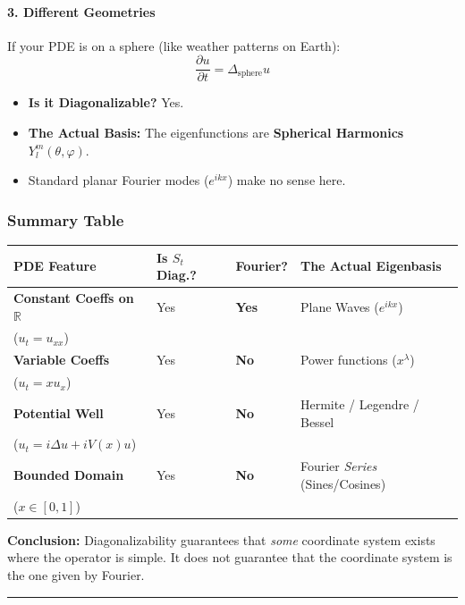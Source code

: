 \documentclass[oneside]{book}
\renewcommand{\phi}{\varphi}
\begin{document}
\paragraph{3. Different Geometries}
If your PDE is on a sphere (like weather patterns on Earth):
\[ \frac{\partial u}{\partial t} = \Delta_{\text{sphere}} u \]
\begin{itemize}
    \item \textbf{Is it Diagonalizable?} Yes.
    \item \textbf{The Actual Basis:} The eigenfunctions are \textbf{Spherical Harmonics} $Y_{l}^{m}(\theta, \phi)$.
    \item Standard planar Fourier modes ($e^{ikx}$) make no sense here.
\end{itemize}

\subsubsection*{Summary Table}

\begin{center}
\begin{tabular}{|l|l|l|l|}
\hline
\textbf{PDE Feature} & \textbf{Is $S_t$ Diag.?} & \textbf{Fourier?} & \textbf{The Actual Eigenbasis} \\ \hline
\textbf{Constant Coeffs on $\mathbb{R}$} & Yes & \textbf{Yes} & Plane Waves ($e^{ikx}$) \\
($u_t = u_{xx}$) & & & \\ \hline
\textbf{Variable Coeffs} & Yes & \textbf{No} & Power functions ($x^\lambda$) \\
($u_t = x u_x$) & & & \\ \hline
\textbf{Potential Well} & Yes & \textbf{No} & Hermite / Legendre / Bessel \\
($u_t = i\Delta u + iV(x)u$) & & & \\ \hline
\textbf{Bounded Domain} & Yes & \textbf{No} & Fourier \textit{Series} (Sines/Cosines) \\
($x \in [0,1]$) & & & \\ \hline
\end{tabular}
\end{center}

\textbf{Conclusion:} Diagonalizability guarantees that \textit{some} coordinate system exists where the operator is simple. It does not guarantee that the coordinate system is the one given by Fourier.

\noindent\rule{\textwidth}{0.4pt}
\end{document}
